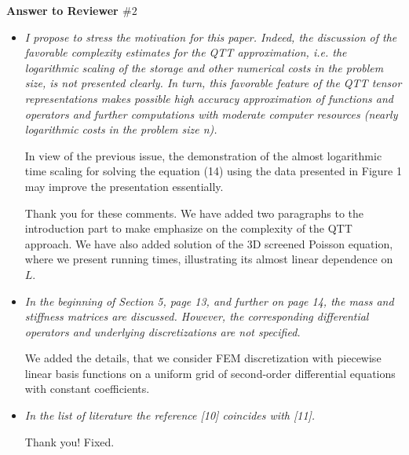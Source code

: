 \documentclass[12pt]{article}
\def\QST{\it\small}
\def\ANS{\noindent\par\rm\normalsize}
\begin{document}






\begin{center}
\Large\bfseries{Answer to Reviewer $\# 2$}
\end{center}


\begin{itemize}

\item\QST
I propose to stress the motivation for this paper. Indeed, the discussion of the favorable complexity estimates for the QTT approximation, i.e. the logarithmic scaling of the storage and other numerical costs in the problem size, is not presented clearly. In turn, this favorable feature of the QTT tensor representations makes possible high accuracy approximation of functions and operators and further computations with moderate computer resources (nearly logarithmic costs in the problem size n).

In view of the previous issue, the demonstration of the almost logarithmic time scaling for solving the equation (14) using the data presented in Figure 1 may improve the presentation essentially.

\ANS

Thank you for these comments. We have added two paragraphs to the introduction part to make emphasize on the complexity of the QTT approach.
We have also added solution of the 3D screened Poisson equation, where we present running times, illustrating its almost linear dependence on $L$.

\item\QST
In the beginning of Section 5, page 13, and further on page 14, the mass and stiffness matrices are discussed. However, the corresponding differential operators and underlying discretizations are not specified.

\ANS

We  added the details, that we consider FEM discretization with piecewise linear basis functions on a uniform grid of second-order differential equations with constant coefficients.


\item\QST
In the list of literature the reference [10] coincides with [11].

\ANS

Thank you! Fixed.

\end{itemize}
\end{document}
